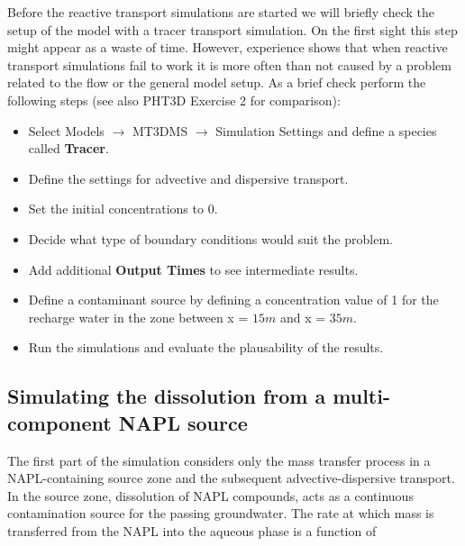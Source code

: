 Before the reactive transport simulations are started we will briefly check
the setup of the model with a tracer transport simulation. On the first sight 
this step might appear as a waste of time. However, experience shows
that when reactive transport simulations fail to work it is more often than not
caused by a problem related to the flow or the general model setup. 
As a brief check perform the following steps (see also PHT3D Exercise 2 for comparison):

\begin{itemize} 

\item Select Models $\rightarrow$ MT3DMS $\rightarrow$ Simulation Settings and define
a species called {\color{red} \textbf{Tracer}}.

\item Define the settings for advective and dispersive transport. 

\item Set the initial concentrations to 0.

\item Decide what type of boundary conditions would suit the problem.

\item Add additional {\color{red} \textbf{Output Times}} to see intermediate results.

\item Define a contaminant source by defining a concentration value of 1 for the recharge water in the zone between x = $15 m$ and x = $35 m$.

\item Run the simulations and evaluate the plausability of the results. 

\end{itemize}

\subsection[Simulating the dissolution from a multi-component NAPL source]{Simulating the dissolution from a multi-component NAPL source}
 
The first part of the simulation considers only the mass transfer 
process in a NAPL-containing source zone and the 
subsequent advective-dispersive transport. In the source zone, 
dissolution of NAPL compounds,
\citep[e.g.,][]{miller_trapped_90} acts as a continuous contamination source
for the passing groundwater. The rate at which mass is transferred
from the NAPL into the aqueous phase is a function of

